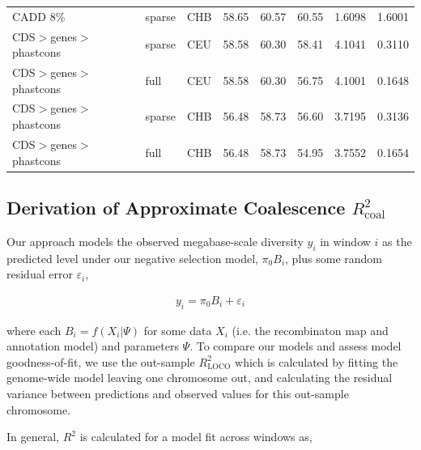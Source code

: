 \documentclass[11pt]{article}
\begin{document}
\begin{table}
\begin{tabular}{lll|crr|cc}
               CADD 8\% &            sparse &          CHB &                        58.65 &             60.57 &            60.55 &                                 1.6098 &                                1.6001 \\
CDS$>$genes$>$phastcons &            sparse &          CEU &                        58.58 &             60.30 &            58.41 &                                 4.1041 &                                0.3110 \\
CDS$>$genes$>$phastcons &              full &          CEU &                        58.58 &             60.30 &            56.75 &                                 4.1001 &                                0.1648 \\
CDS$>$genes$>$phastcons &            sparse &          CHB &                        56.48 &             58.73 &            56.60 &                                 3.7195 &                                0.3136 \\
CDS$>$genes$>$phastcons &              full &          CHB &                        56.48 &             58.73 &            54.95 &                                 3.7552 &                                0.1654 \\
\hline
\end{tabular}
\end{table}


\subsection{Derivation of Approximate Coalescence $R_\text{coal}^2$}
\label{supp:r2-coal}

Our approach models the observed megabase-scale diversity $y_i$ in window $i$
as the predicted level under our negative selection model, $\pi_0 B_i$, plus
some random residual error $\varepsilon_i$,

\begin{align}
    y_i = \pi_0 B_i + \varepsilon_i
\end{align}

where each $B_i = f(X_i | \Psi)$ for some data $X_i$ (i.e. the recombinaton map
and annotation model) and parameters $\Psi$. To compare our models and assess
model goodness-of-fit, we use the out-sample $R_\text{LOCO}^2$ which is
calculated by fitting the genome-wide model leaving one chromosome out, and
calculating the residual variance between predictions and observed values for
this out-sample chromosome. 

In general, $R^2$ is calculated for a model fit across windows as,
\end{document}
